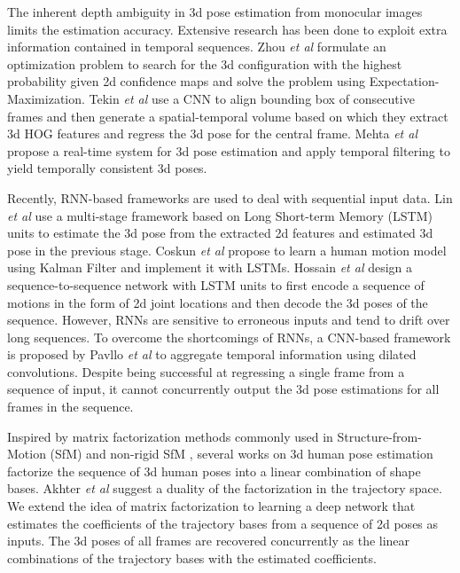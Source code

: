 \documentclass{bmvc2k}
\def\etal{\emph{et al}\bmvaOneDot}
\begin{document}
The inherent depth ambiguity in 3d pose estimation from monocular images limits the estimation accuracy. Extensive research has been done to exploit extra information contained in temporal sequences.
Zhou \etal \cite{zhou2016sparseness} formulate an optimization problem to search for the 3d configuration with the highest probability given 2d confidence maps and solve the problem using Expectation-Maximization.
Tekin \etal \cite{tekin2016direct} use a CNN to align bounding box of consecutive frames and then generate a spatial-temporal volume based on which they extract 3d HOG features and regress the 3d pose for the central frame.
Mehta \etal \cite{mehta2017vnect} propose a real-time system for 3d pose estimation and apply temporal filtering to yield temporally consistent 3d poses.

Recently, RNN-based frameworks are used to deal with sequential input data.
Lin \etal \cite{lin2017recurrent} use a multi-stage framework based on Long Short-term Memory (LSTM) units to estimate the 3d pose from the extracted 2d features and estimated 3d pose in the previous stage.
Coskun \etal \cite{coskun2017long} propose to learn a human motion model using Kalman Filter and implement it with LSTMs.
Hossain \etal \cite{hossain2018exploiting} design a sequence-to-sequence network with LSTM units to first encode a sequence of motions in the form of 2d joint locations and then decode the 3d poses of the sequence.
However, RNNs are sensitive to erroneous inputs and tend to drift over long sequences.
To overcome the shortcomings of RNNs, a CNN-based framework is proposed by Pavllo \etal \cite{pavllo20183d} to aggregate temporal information using dilated convolutions. Despite being successful at regressing a single frame from a sequence of input, it cannot concurrently output the 3d pose estimations for all frames in the sequence. 

Inspired by matrix factorization methods commonly used in Structure-from-Motion (SfM) \cite{tomasi1992shape} and non-rigid SfM \cite{bregler2000recovering}, several works \cite{ramakrishna2012reconstructing, zhou20153d, zhou2016sparseness} on 3d human pose estimation factorize the sequence of 3d human poses into a linear combination of shape bases. Akhter \etal \cite{akhter2009nonrigid} suggest a duality of the factorization in the trajectory space. We extend the idea of 
matrix factorization to learning a deep network that estimates the coefficients of the trajectory bases from a sequence of 2d poses as inputs. The 3d poses of all frames are recovered concurrently as the linear combinations of the trajectory bases with the estimated coefficients.  
\end{document}
